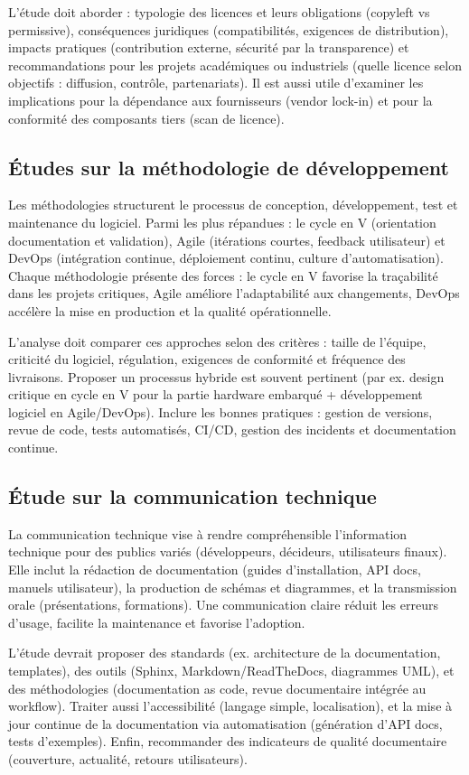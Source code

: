 L’étude doit aborder : typologie des licences et leurs obligations (copyleft vs permissive), conséquences juridiques (compatibilités, exigences de distribution), impacts pratiques (contribution externe, sécurité par la transparence) et recommandations pour les projets académiques ou industriels (quelle licence selon objectifs : diffusion, contrôle, partenariats). Il est aussi utile d’examiner les implications pour la dépendance aux fournisseurs (vendor lock-in) et pour la conformité des composants tiers (scan de licence).

\subsection{Études sur la méthodologie de développement}
Les méthodologies structurent le processus de conception, développement, test et maintenance du logiciel. Parmi les plus répandues : le cycle en V (orientation documentation et validation), Agile (itérations courtes, feedback utilisateur) et DevOps (intégration continue, déploiement continu, culture d’automatisation). Chaque méthodologie présente des forces : le cycle en V favorise la traçabilité dans les projets critiques, Agile améliore l’adaptabilité aux changements, DevOps accélère la mise en production et la qualité opérationnelle.

L’analyse doit comparer ces approches selon des critères : taille de l’équipe, criticité du logiciel, régulation, exigences de conformité et fréquence des livraisons. Proposer un processus hybride est souvent pertinent (par ex. design critique en cycle en V pour la partie hardware embarqué + développement logiciel en Agile/DevOps). Inclure les bonnes pratiques : gestion de versions, revue de code, tests automatisés, CI/CD, gestion des incidents et documentation continue.

\subsection{Étude sur la communication technique}
La communication technique vise à rendre compréhensible l’information technique pour des publics variés (développeurs, décideurs, utilisateurs finaux). Elle inclut la rédaction de documentation (guides d’installation, API docs, manuels utilisateur), la production de schémas et diagrammes, et la transmission orale (présentations, formations). Une communication claire réduit les erreurs d’usage, facilite la maintenance et favorise l’adoption.

L’étude devrait proposer des standards (ex. architecture de la documentation, templates), des outils (Sphinx, Markdown/ReadTheDocs, diagrammes UML), et des méthodologies (documentation as code, revue documentaire intégrée au workflow). Traiter aussi l’accessibilité (langage simple, localisation), et la mise à jour continue de la documentation via automatisation (génération d’API docs, tests d’exemples). Enfin, recommander des indicateurs de qualité documentaire (couverture, actualité, retours utilisateurs).

